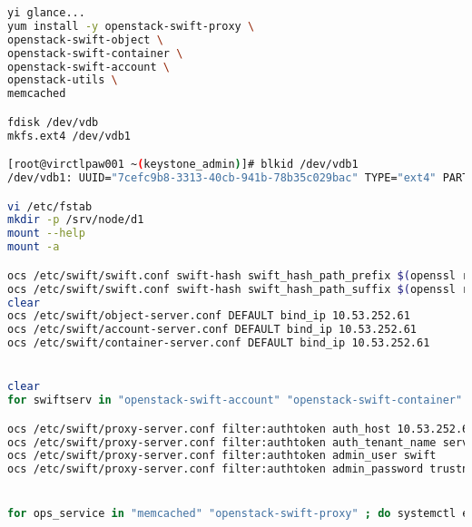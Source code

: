 \documentclass[11pt,letterpaper,oneside]{book}
\begin{document}
\begin{lstlisting}[caption={foo},language=bash]
yi glance...
yum install -y openstack-swift-proxy \
openstack-swift-object \
openstack-swift-container \
openstack-swift-account \
openstack-utils \
memcached

fdisk /dev/vdb
mkfs.ext4 /dev/vdb1 

[root@virctlpaw001 ~(keystone_admin)]# blkid /dev/vdb1 
/dev/vdb1: UUID="7cefc9b8-3313-40cb-941b-78b35c029bac" TYPE="ext4" PARTUUID="9faed234-01" 

vi /etc/fstab 
mkdir -p /srv/node/d1
mount --help
mount -a

ocs /etc/swift/swift.conf swift-hash swift_hash_path_prefix $(openssl rand -hex 10)
ocs /etc/swift/swift.conf swift-hash swift_hash_path_suffix $(openssl rand -hex 10)
clear
ocs /etc/swift/object-server.conf DEFAULT bind_ip 10.53.252.61
ocs /etc/swift/account-server.conf DEFAULT bind_ip 10.53.252.61
ocs /etc/swift/container-server.conf DEFAULT bind_ip 10.53.252.61


clear
for swiftserv in "openstack-swift-account" "openstack-swift-container" "openstack-swift-object"; do systemctl enable $swiftserv; systemctl start $swiftserv; done

ocs /etc/swift/proxy-server.conf filter:authtoken auth_host 10.53.252.61
ocs /etc/swift/proxy-server.conf filter:authtoken auth_tenant_name service
ocs /etc/swift/proxy-server.conf filter:authtoken admin_user swift
ocs /etc/swift/proxy-server.conf filter:authtoken admin_password trustn01


for ops_service in "memcached" "openstack-swift-proxy" ; do systemctl enable $ops_service; systemctl start $ops_service; done


\end{lstlisting}
\end{document}
